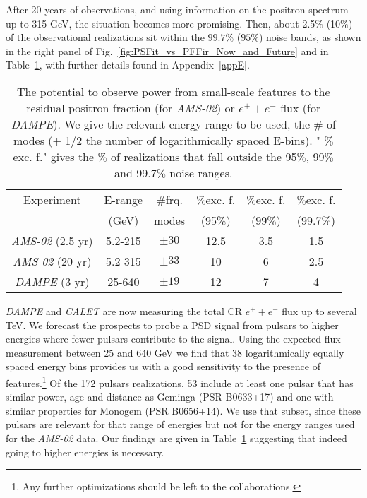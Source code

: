 \documentclass[aps,prd,twocolumn,amsmath,superscriptaddress,amssymb,showpacs,floatfix,nofootinbib]{revtex4-1}
\begin{document}
After 20 years of observations, and using information on the
positron spectrum up to 315 GeV, the situation becomes more
promising. Then, about 2.5$\%$ (10$\%$) of the observational
realizations sit within the $99.7 \%$ ($95 \%$) noise bands, as
shown in the right panel of
Fig.~\ref{fig:PSFit_vs_PFFir_Now_and_Future} and in
Table~\ref{tab:PSTab}, with further details found in Appendix~\ref{appE}.
\begin{table}[t]
    \begin{tabular}{cccccc}
         \hline
           Experiment & E-range & $\#$frq. & $\%$exc. f. & $\%$exc. f. & $\%$exc. f. \\
                  & (GeV) & modes & (95$\%$) & (99$\%$)  & (99.7$\%$)  \\
            \hline \hline
            \textit{AMS-02} (2.5 yr) & 5.2-215 & $\pm 30$ & 12.5 & 3.5 & 1.5 \\
            \textit{AMS-02} (20 yr) & 5.2-315 &  $\pm 33$ & 10 & 6 & 2.5 \\
            \textit{DAMPE} (3 yr) &  25-640 &  $\pm 19$ & 12 & 7 & 4\\
            \hline \hline 
        \end{tabular}
\caption{The potential to observe power from small-scale features to the residual positron 
fraction (for \textit{AMS-02}) or $e^{+}+e^{-}$ flux (for \textit{DAMPE}).  We give the relevant energy range to be used, the $\#$ of modes ($\pm$ 1/2 the number of logarithmically spaced E-bins). " $\%$exc. f." gives the $\%$
of realizations that fall outside the 95$\%$, 99$\%$ and 99.7$\%$ noise ranges.} 
\vspace{-0.7cm}
\label{tab:PSTab}
\end{table}

\textit{DAMPE} \cite{TheDAMPE:2017dtc, Ambrosi:2017wek} and \textit{CALET}
\cite{2015JPhCS.632a2023A, Adriani:2017efm} are now measuring the total CR $e^{+}
+ e^{-}$ flux up to several TeV.  We forecast the prospects
to probe a PSD signal from pulsars to higher energies where
fewer pulsars contribute to the signal.  Using the
expected flux measurement between 25 and 640 GeV we find that 
38 logarithmically equally spaced energy bins provides us
with a good sensitivity to the presence of
features.\footnote{Any further optimizations should be left to
the collaborations.}  Of the 172 pulsars realizations, 53
include at least one pulsar that has similar power, age and
distance  as Geminga (PSR B0633+17) and one with similar
properties for Monogem (PSR B0656+14).  We use that subset,
since these pulsars are relevant for that range of energies but
not for the energy ranges used for the \textit{AMS-02} data. Our
findings are given in Table~\ref{tab:PSTab} suggesting that
indeed going to higher energies is necessary.
\end{document}
